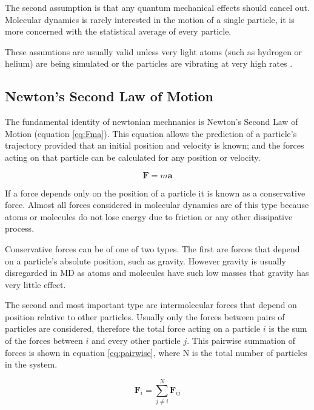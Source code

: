 \message{ !name(main.tex)}\documentclass[12pt]{UoAthesis}
\begin{document}
The second assumption is that any quantum mechanical effects should
cancel out. Molecular dynamics is rarely interested in the motion of a
single particle, it is more concerned with the statistical average of
every particle.

These assumtions are usually valid unless very light atoms (such as
hydrogen or helium) are being simulated or the particles are vibrating
at very high rates \cite{Frenkel2002}.

\subsection{Newton's Second Law of Motion \label{NewtonLaw}}

The fundamental identity of newtonian mechnanics is Newton's Second
Law of Motion (equation \eqref{eq:Fma}). This equation allows the prediction of a
particle's trajectory provided that an initial position and velocity
is known; and the forces acting on that particle can be calculated for
any position or velocity.

\begin{equation}
  \mathbf{F} = m\mathbf{a}
  \label{eq:Fma} 
\end{equation}

If a force depends only on the position of a particle it is known as a
conservative force. Almost all forces considered in molecular dynamics
are of this type because atoms or molecules do not lose energy due to
friction or any other dissipative process.

Conservative forces can be of one of two types.  The first are forces
that depend on a particle's absolute position, such as gravity.
However gravity is usually disregarded in MD as atoms and molecules
have such low masses that gravity has very little effect.

The second and most important type are intermolecular forces that
depend on position relative to other particles.  Usually only the
forces between pairs of particles are considered, therefore the total
force acting on a particle $i$ is the sum of the forces between $i$
and every other particle $j$.  This pairwise summation of forces is
shown in equation \eqref{eq:pairwise}, where N is the total number of
particles in the system.

\begin{equation} 
  \mathbf{F}_i = \sum_{j \not= i}^{N}\mathbf{F}_{ij}
  \label{eq:pairwise}
\end{equation}
\end{document}
